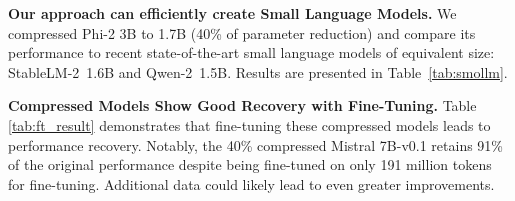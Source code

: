 \documentclass[11pt]{article}
\newcommand{\myparagraph}[1]{\noindent\textbf{#1}}
\begin{document}
\myparagraph{Our approach can efficiently create Small Language Models.} We compressed Phi-2 3B to 1.7B (40\% of parameter reduction) and compare its performance to recent state-of-the-art small language models of equivalent size: StableLM-2~1.6B and Qwen-2~1.5B. Results are presented in Table~\ref{tab:smollm}.

\myparagraph{Compressed Models Show Good Recovery with Fine-Tuning.} Table \ref{tab:ft_result} demonstrates that fine-tuning these compressed models leads to performance recovery. Notably, the 40\% compressed Mistral 7B-v0.1 retains 91\% of the original performance despite being fine-tuned on only 191 million tokens for fine-tuning. Additional data could likely lead to even greater improvements.

\begin{table}[t]
    \caption{\textbf{Compressed models recover well when finetuned.} Zero-shot performances of the base non-compressed models (0\%) and the 40\% compressed models, without and with fine-tuning (FT). Models were fine-tuned on the whole Slim-Orca dataset (191 million tokens).}
    \label{tab:ft_result}
\end{table}
\end{document}
